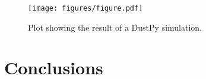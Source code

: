 \documentclass{aa}
\begin{document}
\begin{figure}
    \begin{centering}
        \texttt{[image: figures/figure.pdf]}
        \caption{
            Plot showing the result of a DustPy simulation.
        }
        \label{fig:simulation_dustpy}
    \end{centering}
\end{figure}

\section{Conclusions}

\begin{acknowledgements}
\end{acknowledgements}

\end{document}
